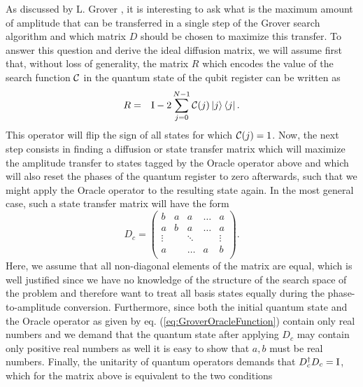 As discussed by L. Grover \citep{grover_schrodingers_2001}, it is interesting to ask what is the maximum amount of amplitude that can be transferred in a single step of the Grover search algorithm and which matrix $D$ should be chosen to maximize this transfer. To answer this question and derive the ideal diffusion matrix, we will assume first that, without loss of generality, the matrix $R$ which encodes the value of the search function $\Or$ in the quantum state of the qubit register can be written as
%
\begin{eqnarray}
R & = & \begin{mathrm}I\end{mathrm}-2\sum\limits_{j=0}^{N-1} \Or(j)\ket{j}\bra{j}. \label{eq:GroverOracleFunction}
\end{eqnarray}
%
This operator will flip the sign of all states for which $\Or(j) = 1$. Now, the next step consists in finding a diffusion or state transfer matrix which will maximize the amplitude transfer to states tagged by the Oracle operator above and which will also reset the phases of the quantum register to zero afterwards, such that we might apply the Oracle operator to the resulting state again. In the most general case, such a state transfer matrix will have the form
%
\begin{equation}
D_c = \left(	
	\begin{array}{ccccc}
		b & a & a & \hdots & a \\
		a & b & a & \hdots & a \\
		\vdots & & \ddots &  &\vdots \\
		a & & \hdots & a & b \\
	\end{array}
\right).
\end{equation}
%
Here, we assume that all non-diagonal elements of the matrix are equal, which is well justified since we have no knowledge of the structure of the search space of the problem and therefore want to treat all basis states equally during the phase-to-amplitude conversion. Furthermore, since both the initial quantum state and the Oracle operator as given by eq. (\ref{eq:GroverOracleFunction}) contain only real numbers and we demand that the quantum state after applying $D_c$ may contain only positive real numbers as well it is easy to show that $a,b$ must be real numbers. Finally, the unitarity of quantum operators demands that $D_c^\dagger D_c = \begin{mathrm}I\end{mathrm}$, which for the matrix above is equivalent to the two conditions

